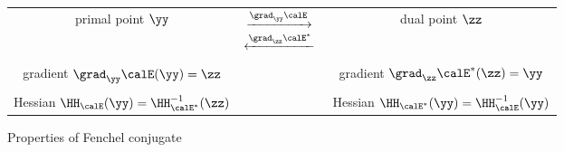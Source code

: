 \begin{figure}[H]
\begin{mdframed}
  \centering
\begin{center}
\begin{tabular}{ c c c }
 primal point $\yy$
  & $  \begin{matrix}
    \xrightarrow{\grad_{\yy} \calE }{} \\
     \xleftarrow{\grad_{\zz} \calE^* }{}
   \end{matrix}$ &
                   dual point $\zz$ \\
  \\
 gradient $\grad_{\yy} \calE(\yy) = \zz$  & & gradient $\grad_{\zz}
                                              \calE^*(\zz) = \yy$ \\
  \\
 Hessian $\HH_{\calE}(\yy) = \HH_{\calE^*}^{-1}(\zz) $ & & Hessian $\HH_{\calE^*}(\yy) = \HH_{\calE}^{-1}(\yy)$
\end{tabular}
\end{center}
  \caption{Properties of Fenchel conjugate}
  \label{fig:fenchel}
\end{mdframed}
\end{figure}

